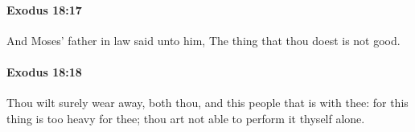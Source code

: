		\paragraph{Exodus 18:17} %
			\label{EXODUS-18-17}

			And Moses' father in law said unto him, The thing that thou doest is not good.


		\paragraph{Exodus 18:18} %
			\label{EXODUS-18-18}

			Thou wilt surely wear away, both thou, and this people that is with thee: for this thing is too heavy for thee; thou art not able to perform it thyself alone.


